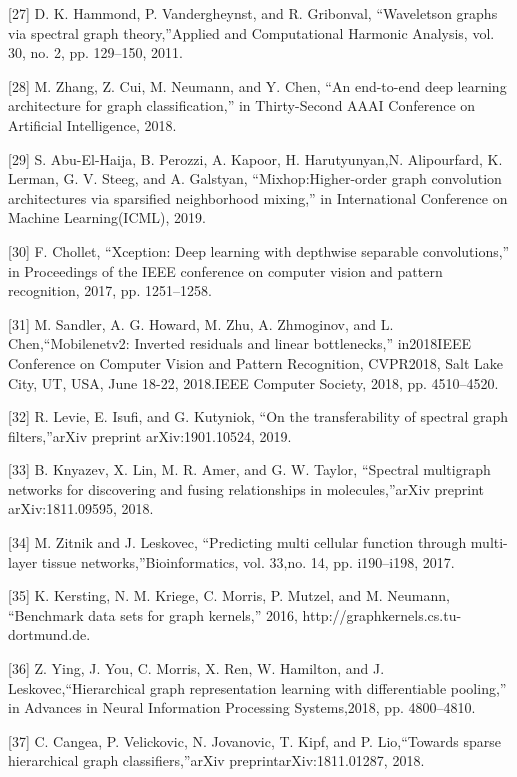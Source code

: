 \documentclass{article}
\begin{document}
[27]  D. K. Hammond, P. Vandergheynst, and R. Gribonval, “Waveletson  graphs  via  spectral  graph  theory,”Applied  and  Computational Harmonic Analysis, vol. 30, no. 2, pp. 129–150, 2011.

[28]  M.  Zhang,  Z.  Cui,  M.  Neumann,  and  Y.  Chen,  “An  end-to-end deep  learning  architecture  for  graph  classification,”  in Thirty-Second AAAI Conference on Artificial Intelligence, 2018.

[29]  S.   Abu-El-Haija,   B.   Perozzi,   A.   Kapoor,   H.   Harutyunyan,N. Alipourfard, K. Lerman, G. V. Steeg, and A. Galstyan, “Mixhop:Higher-order graph convolution architectures via sparsified neighborhood  mixing,”  in International  Conference  on  Machine  Learning(ICML), 2019.

[30]  F.  Chollet,  “Xception:  Deep  learning  with  depthwise  separable convolutions,”  in Proceedings  of  the  IEEE  conference  on  computer vision and pattern recognition, 2017, pp. 1251–1258.

[31]  M. Sandler, A. G. Howard, M. Zhu, A. Zhmoginov, and L. Chen,“Mobilenetv2: Inverted residuals and linear bottlenecks,” in2018IEEE Conference on Computer Vision and Pattern Recognition, CVPR2018, Salt Lake City, UT, USA, June 18-22, 2018.IEEE Computer Society, 2018, pp. 4510–4520.

[32]  R.  Levie,  E.  Isufi,  and  G.  Kutyniok,  “On  the  transferability  of spectral graph filters,”arXiv preprint arXiv:1901.10524, 2019.

[33]  B.  Knyazev,  X.  Lin,  M.  R.  Amer,  and  G.  W.  Taylor,  “Spectral multigraph networks for discovering and fusing relationships in molecules,”arXiv preprint arXiv:1811.09595, 2018.

[34]  M.  Zitnik  and  J.  Leskovec,  “Predicting  multi cellular  function through   multi-layer   tissue   networks,”Bioinformatics,   vol.   33,no. 14, pp. i190–i198, 2017.

[35]  K.  Kersting,  N.  M.  Kriege,  C.  Morris,  P.  Mutzel,  and  M.  Neumann,  “Benchmark  data  sets  for  graph  kernels,”  2016,  http://graphkernels.cs.tu-dortmund.de.

[36]  Z. Ying, J. You, C. Morris, X. Ren, W. Hamilton, and J. Leskovec,“Hierarchical  graph  representation  learning  with  differentiable pooling,”  in Advances  in  Neural  Information  Processing  Systems,2018, pp. 4800–4810.

[37]  C.   Cangea,   P.   Velickovic,   N.   Jovanovic,   T.   Kipf,   and   P.   Lio,“Towards  sparse  hierarchical  graph  classifiers,”arXiv  preprintarXiv:1811.01287, 2018.
\end{document}
